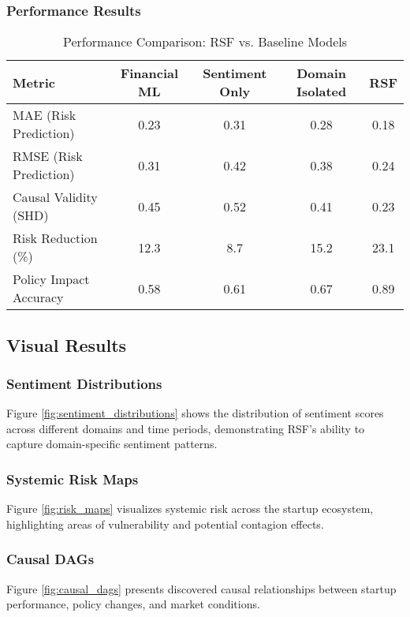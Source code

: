 \documentclass[conference]{IEEEtran}
\begin{document}
\subsubsection{Performance Results}

\begin{table}[H]
\centering
\caption{Performance Comparison: RSF vs. Baseline Models}
\label{tab:performance_comparison}
\begin{tabular}{@{}lcccc@{}}
\toprule
\textbf{Metric} & \textbf{Financial ML} & \textbf{Sentiment Only} & \textbf{Domain Isolated} & \textbf{RSF} \\
\midrule
MAE (Risk Prediction) & 0.23 & 0.31 & 0.28 & 0.18 \\
RMSE (Risk Prediction) & 0.31 & 0.42 & 0.38 & 0.24 \\
Causal Validity (SHD) & 0.45 & 0.52 & 0.41 & 0.23 \\
Risk Reduction (\%) & 12.3 & 8.7 & 15.2 & 23.1 \\
Policy Impact Accuracy & 0.58 & 0.61 & 0.67 & 0.89 \\
\bottomrule
\end{tabular}
\end{table}

\subsection{Visual Results}

\subsubsection{Sentiment Distributions}
Figure \ref{fig:sentiment_distributions} shows the distribution of sentiment scores across different domains and time periods, demonstrating RSF's ability to capture domain-specific sentiment patterns.

\subsubsection{Systemic Risk Maps}
Figure \ref{fig:risk_maps} visualizes systemic risk across the startup ecosystem, highlighting areas of vulnerability and potential contagion effects.

\subsubsection{Causal DAGs}
Figure \ref{fig:causal_dags} presents discovered causal relationships between startup performance, policy changes, and market conditions.
\end{document}
